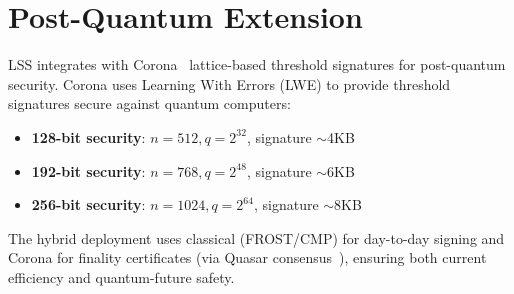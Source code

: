 \section{Post-Quantum Extension}


LSS integrates with Corona~\cite{corona} lattice-based threshold signatures for post-quantum security. Corona uses Learning With Errors (LWE) to provide threshold signatures secure against quantum computers:

\begin{itemize}[nosep]
  \item \textbf{128-bit security}: $n = 512, q = 2^{32}$, signature $\sim$4KB
  \item \textbf{192-bit security}: $n = 768, q = 2^{48}$, signature $\sim$6KB
  \item \textbf{256-bit security}: $n = 1024, q = 2^{64}$, signature $\sim$8KB
\end{itemize}

The hybrid deployment uses classical (FROST/CMP) for day-to-day signing and Corona for finality certificates (via Quasar consensus~\cite{quasar}), ensuring both current efficiency and quantum-future safety.

